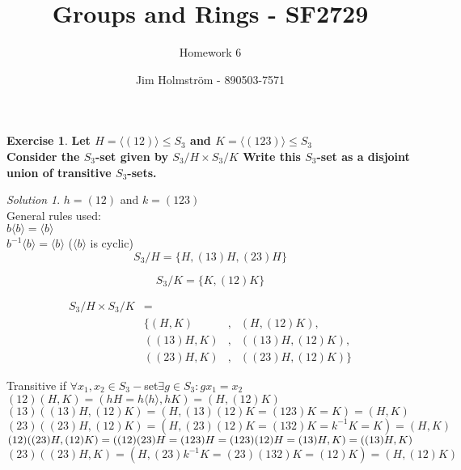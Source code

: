 \documentclass[a4paper,twoside=false,abstract=false,numbers=noenddot,
titlepage=false,headings=small,parskip=half,version=last]{scrartcl}
\author{Jim Holmström - 890503-7571}
\title{Groups and Rings - SF2729}
\subtitle{Homework 6}
\theoremstyle{definition}
\newtheorem{exercise}{Exercise}
\theoremstyle{remark}
\newtheorem*{solution}{Solution}
\begin{document}
\maketitle
\thispagestyle{empty}

\begin{exercise}
{\bf
Let $H=\langle (12) \rangle \le S_3$ and $K=\langle (123) \rangle \le S_3$\\
Consider the $S_3$-set given by $S_3/H \times S_3/K$ Write this $S_3$-set as a
disjoint union of transitive $S_3$-sets.
}
\end{exercise}
\begin{solution}

$h=(12)$ and $k=(123)$ \\

General rules used:\\
$b\langle b \rangle=\langle b \rangle$\\
$b^{-1}\langle b \rangle=\langle b \rangle$ ($\langle b \rangle$ is cyclic)\\


\begin{equation*}
    S_3/H=\{H,(13)H,(23)H\}
\end{equation*}

\begin{equation*}
    S_3/K=\{K,(12)K\}
\end{equation*}

\begin{align*}
    S_3/H \times S_3/K  &=        & &\\
                        &\{  (H,K)&,& (    H,(12)K), \\
                        &((13)H,K)&,& ((13)H,(12)K), \\
                        &((23)H,K)&,& ((23)H,(12)K)\}
\end{align*}

Transitive if $\forall x_1,x_2 \in S_3-$set$\exists g \in S_3 : gx_1 = x_2$\\

$(12)(H,K)=(hH=h\langle h\rangle ,hK)=(H,(12)K)$\\
$(13)((13)H,(12)K)=(H,(13)(12)K=(123)K=K)=(H,K)$\\
$(23)((23)H,(12)K)=(H,(23)(12)K=(132)K=k^{-1}K=K)=(H,K)$\\
$(12)((23)H,(12)K)=((12)(23)H=(123)H=(123)(12)H=(13)H,K)=((13)H,K)\\$
$(23)((23)H,K)=(H,(23)k^{-1}K=(23)(132)K=(12)K)=(H,(12)K)$\\


\end{solution}
\end{document}
